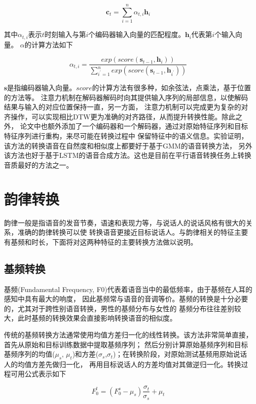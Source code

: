 \begin{equation}
    \mathbf{c}_t = \sum^n_{i=1}\alpha_{t, i}\mathbf{h}_i
\end{equation}

其中$\alpha_{t, i}$表示$t$时刻输入与第$i$个编码器输入向量的匹配程度。$\mathbf{h}_i$代表第$i$个输入向量。
$\alpha$的计算方法如下

\begin{equation}
    \alpha_{t, i} = \frac{exp(score(\mathbf{s}_{t-1},\mathbf{h}_i))}{\sum^{n}_{i^{'}=1}exp(score(\mathbf{s}_{t-1},\mathbf{h}_{i^{'}}))}
\end{equation}

$\mathbf{s}$是指编码器输入向量。$score$的计算方法有很多种，如余弦法，点乘法，基于位置的方法等。
注意力机制在解码器解码时向其提供输入序列的局部信息，以使解码结果与输入的对应位置保持一直，另一方面，
注意力机制可以完成更为复杂的对齐操作，可以实现相比DTW更为准确的对齐路径，从而提升转换性能。除此之外，
论文中也额外添加了一个编码器和一个解码器，通过对原始特征序列和目标特征序列进行重构，来尽可能在转换过程中
保留特征中的语义信息。实验证明，该方法的转换语音在自然度和相似度上都要好于基于GMM的语音转换方法，
另外该方法也好于基于LSTM的语音合成方法。这也是目前在平行语音转换任务上转换音质最好的方法之一。

\section{韵律转换}
韵律一般是指语音的发音节奏，语速和表现力等，与说话人的说话风格有很大的关系，准确的韵律转换可以使
转换语音更接近目标说话人。与韵律相关的特征主要有基频和时长，下面将对这两种特征的主要转换方法做以说明。

\subsection{基频转换}
基频(Fundamental Frequency, F0)代表着语音当中的最低频率，由于基频在人耳的感知中具有最大的响度，
因此基频常与语音的音调等价。基频的转换是十分必要的，尤其对于跨性别语音转换，男性的基频分布与女性的
基频分布往往差别较大，此时基频的转换效果会直接影响转换语音的相似度。

传统的基频转换方法通常使用均值方差归一化的线性转换。该方法非常简单直接，首先从原始和目标训练数据中提取基频序列；
然后分别计算原始基频序列和目标基频序列的均值($\mu_s$, $\mu_t$)和方差($\sigma_s$,$\sigma_t$)；在转换阶段，对原始测试基频用原始说话人的均值方差先做归一化，
再用目标说话人的方差均值对其做逆归一化。转换过程可用公式表示如下

\begin{equation}
    F_0^t = (F_0^s - \mu_s)\frac{\sigma_t}{\sigma_s} + \mu_t
\end{equation}

